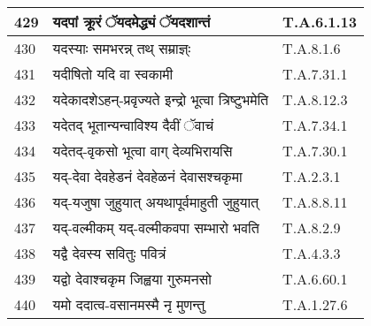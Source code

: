 \documentclass[17pt]{extarticle}
\begin{document}
\begin{longtable}{||p{0.4in}||p{4.9in}||p{0.9in}||}
    \hline
        
    429 & यदपां क्रूरं ॅयदमेद्ध्यं ॅयदशान्तं & T.A.6.1.13       \\
    
    \hline
        
    430 & यदस्याः समभरन्न् तथ् सम्राज्ञ्ः & T.A.8.1.6       \\
    
    \hline
        
    431 & यदीषितो यदि वा स्वकामी & T.A.7.31.1       \\
    
    \hline
        
    432 & यदेकादशेऽहन्{-}प्रवृज्यते इन्द्रो भूत्वा त्रिष्टुभमेति & T.A.8.12.3       \\
    
    \hline
        
    433 & यदेतद् भूतान्यन्वाविश्य दैवीं ॅवाचं & T.A.7.34.1       \\
    
    \hline
        
    434 & यदेतद्{-}वृकसो भूत्वा वाग् देव्यभिरायसि & T.A.7.30.1       \\
    
    \hline
        
    435 & यद्{-}देवा देवहेडनं देवहेळनं देवासश्चकृमा & T.A.2.3.1       \\
    
    \hline
        
    436 & यद्{-}यजुषा जुहुयात् अयथापूर्वमाहुती जुहुयात् & T.A.8.8.11       \\
    
    \hline
        
    437 & यद्{-}वल्मीकम् यद्{-}वल्मीकवपा सम्भारो भवति & T.A.8.2.9       \\
    
    \hline
        
    438 & यद्वै देवस्य सवितुः पवित्रं & T.A.4.3.3       \\
    
    \hline
        
    439 & यद्वो देवाश्चकृम जिह्वया गुरुमनसो & T.A.6.60.1       \\
    
    \hline
        
    440 & यमो ददात्व{-}वसानमस्मै नृ मुणन्तु & T.A.1.27.6       \\
    
    \hline
        

\end{longtable}
\end{document}
